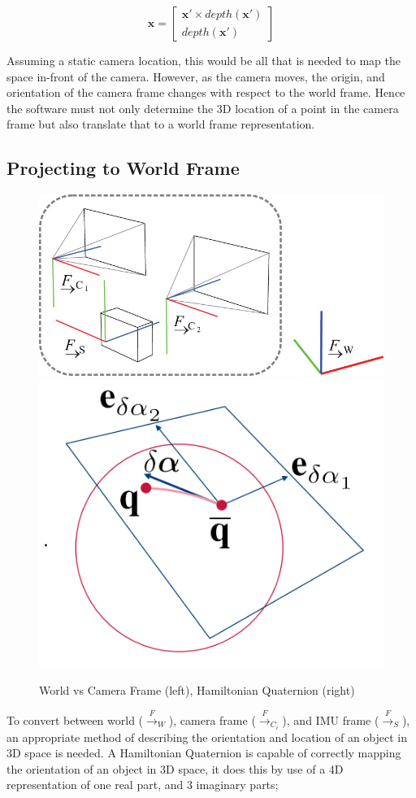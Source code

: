 \documentclass[11pt,twoside]{report}
\begin{document}
\begin{equation}
\mathbf{x} = 
\begin{bmatrix}
\mathbf{x'} \times depth(\mathbf{x'})\\
depth(\mathbf{x'})
\end{bmatrix}
\label{camera_add_depth}
\end{equation}

Assuming a static camera location, this would be all that is needed to map the space in-front of the camera. However, as the camera moves, the origin, and orientation of the camera frame changes with respect to the world frame. Hence the software must not only determine the 3D location of a point in the camera frame but also translate that to a world frame representation.

\subsection{Projecting to World Frame}


\noindent \begin{figure}[h!]
	\includegraphics[width = 0.5\hsize]{figures/world_to_cam.jpg}
	\includegraphics[width = 0.35\hsize]{figures/quaternions.png}
	\caption{World vs Camera Frame (left)\cite{Okvis_1}, Hamiltonian Quaternion (right)}
	\label{quat_wcs}
\end{figure}


To convert between world (${\xrightarrow{F}}_{W}$), camera frame (${\xrightarrow{F}}_{C_{i}}$), and IMU frame (${\xrightarrow{F}}_{S}$), an appropriate method of describing the orientation and location of an object in 3D space is needed. A Hamiltonian Quaternion is capable of correctly mapping the orientation of an object in 3D space, it does this by use of a 4D representation of one real part, and 3 imaginary parts;  
\end{document}
